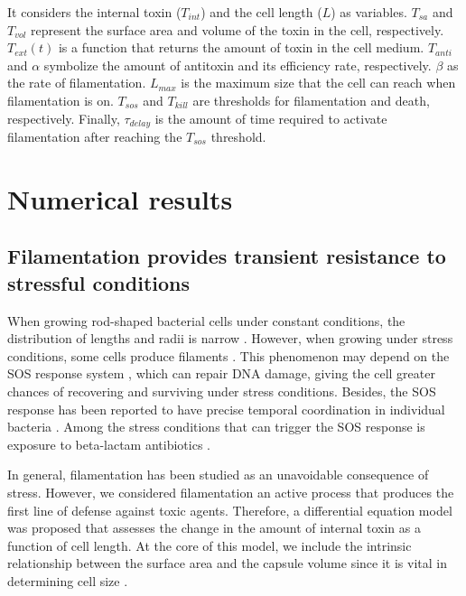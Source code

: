 \documentclass[a4paper, nobind]{templates/ociamthesis}
\begin{document}
It considers the internal toxin (\(T_{int}\)) and the cell length (\(L\)) as variables.
\(T_{sa}\) and \(T_{vol}\) represent the surface area and volume of the toxin in the cell, respectively.
\(T_{ext}(t)\) is a function that returns the amount of toxin in the cell medium.
\(T_{anti}\) and \(\alpha\) symbolize the amount of antitoxin and its efficiency rate, respectively.
\(\beta\) as the rate of filamentation.
\(L_{max}\) is the maximum size that the cell can reach when filamentation is on.
\(T_{sos}\) and \(T_{kill}\) are thresholds for filamentation and death, respectively.
Finally, \(\tau_{delay}\) is the amount of time required to activate filamentation after reaching the \(T_{sos}\) threshold.

\hypertarget{numerical-results}{%
\section{Numerical results}\label{numerical-results}}

\hypertarget{filamentation-provides-transient-resistance-to-stressful-conditions}{%
\subsection{Filamentation provides transient resistance to stressful conditions}\label{filamentation-provides-transient-resistance-to-stressful-conditions}}

When growing rod-shaped bacterial cells under constant conditions, the distribution of lengths and radii is narrow \autocite{schaechterGrowthCellNuclear1962}.
However, when growing under stress conditions, some cells produce filaments \autocite{schaechterDependencyMediumTemperature1958}.
This phenomenon may depend on the SOS response system \autocite{bosEmergenceAntibioticResistance2015}, which can repair DNA damage, giving the cell greater chances of recovering and surviving under stress conditions.
Besides, the SOS response has been reported to have precise temporal coordination in individual bacteria \autocite{friedmanPreciseTemporalModulation2005}.
Among the stress conditions that can trigger the SOS response is exposure to beta-lactam antibiotics \autocite{millerSOSResponseInduction2004}.

In general, filamentation has been studied as an unavoidable consequence of stress.
However, we considered filamentation an active process that produces the first line of defense against toxic agents.
Therefore, a differential equation model was proposed that assesses the change in the amount of internal toxin as a function of cell length.
At the core of this model, we include the intrinsic relationship between the surface area and the capsule volume since it is vital in determining cell size \autocite{harrisRelativeRatesSurface2016}.
\end{document}
